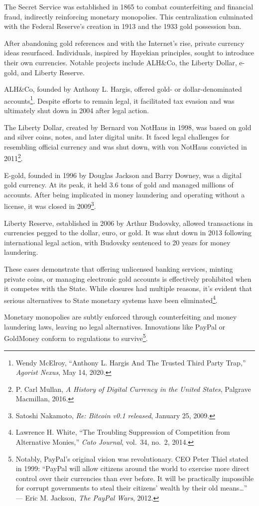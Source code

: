 \documentclass[
  a5paper,
  smalldemyvopaper,10pt,twoside,onecolumn,openright,extrafontsizes,hidelinks]{memoir}
\begin{document}
The Secret Service was established in 1865 to combat counterfeiting and
financial fraud, indirectly reinforcing monetary monopolies. This
centralization culminated with the Federal Reserve's creation in 1913
and the 1933 gold possession ban.

After abandoning gold references and with the Internet's rise, private
currency ideas resurfaced. Individuals, inspired by Hayekian principles,
sought to introduce their own currencies. Notable projects include
ALH\&Co, the Liberty Dollar, e-gold, and Liberty Reserve.

ALH\&Co, founded by Anthony L. Hargis, offered gold- or
dollar-denominated accounts\footnote{Wendy McElroy, ``Anthony L. Hargis
  And The Trusted Third Party Trap,'' \emph{Agorist Nexus}, May 14,
  2020.}. Despite efforts to remain legal, it facilitated tax evasion
and was ultimately shut down in 2004 after legal action.

The Liberty Dollar, created by Bernard von NotHaus in 1998, was based on
gold and silver coins, notes, and later digital units. It faced legal
challenges for resembling official currency and was shut down, with von
NotHaus convicted in 2011\footnote{P. Carl Mullan, \emph{A History of
  Digital Currency in the United States}, Palgrave Macmillan, 2016.}.

E-gold, founded in 1996 by Douglas Jackson and Barry Downey, was a
digital gold currency. At its peak, it held 3.6 tons of gold and managed
millions of accounts. After being implicated in money laundering and
operating without a license, it was closed in 2009\footnote{Satoshi
  Nakamoto, \emph{Re: Bitcoin v0.1 released}, January 25, 2009.}.

Liberty Reserve, established in 2006 by Arthur Budovsky, allowed
transactions in currencies pegged to the dollar, euro, or gold. It was
shut down in 2013 following international legal action, with Budovsky
sentenced to 20 years for money laundering.

These cases demonstrate that offering unlicensed banking services,
minting private coins, or managing electronic gold accounts is
effectively prohibited when it competes with the State. While closures
had multiple reasons, it's evident that serious alternatives to State
monetary systems have been eliminated\footnote{Lawrence H. White, ``The
  Troubling Suppression of Competition from Alternative Monies,''
  \emph{Cato Journal}, vol.~34, no.~2, 2014.}.

Monetary monopolies are subtly enforced through counterfeiting and money
laundering laws, leaving no legal alternatives. Innovations like PayPal
or GoldMoney conform to regulations to survive\footnote{Notably,
  PayPal's original vision was revolutionary. CEO Peter Thiel stated in
  1999: ``PayPal will allow citizens around the world to exercise more
  direct control over their currencies than ever before. It will be
  practically impossible for corrupt governments to steal their
  citizens' wealth by their old means\ldots{}'' --- Eric M. Jackson,
  \emph{The PayPal Wars}, 2012.}.
\end{document}
